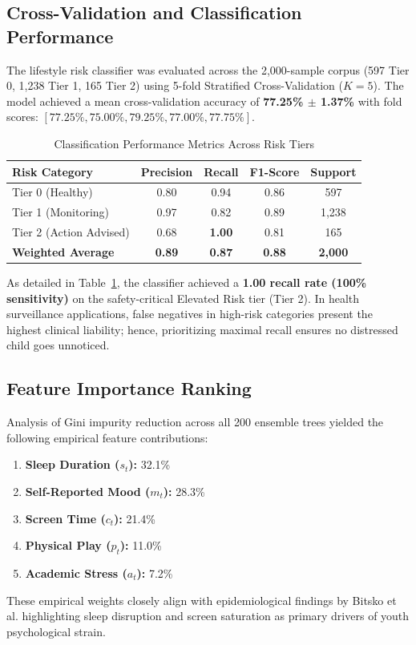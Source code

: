 \documentclass[conference]{IEEEtran}
\begin{document}
\subsection{Cross-Validation and Classification Performance}
The lifestyle risk classifier was evaluated across the 2,000-sample corpus (597 Tier 0, 1,238 Tier 1, 165 Tier 2) using 5-fold Stratified Cross-Validation ($K=5$). The model achieved a mean cross-validation accuracy of \textbf{77.25\% $\pm$ 1.37\%} with fold scores: $[77.25\%, 75.00\%, 79.25\%, 77.00\%, 77.75\%]$.

\begin{table}[htbp]
\centering
\caption{Classification Performance Metrics Across Risk Tiers}
\label{tab:metrics}
\begin{tabular}{lcccc}
\toprule
\textbf{Risk Category} & \textbf{Precision} & \textbf{Recall} & \textbf{F1-Score} & \textbf{Support} \\
\midrule
Tier 0 (Healthy) & 0.80 & 0.94 & 0.86 & 597 \\
Tier 1 (Monitoring) & 0.97 & 0.82 & 0.89 & 1,238 \\
Tier 2 (Action Advised) & 0.68 & \textbf{1.00} & 0.81 & 165 \\
\midrule
\textbf{Weighted Average} & \textbf{0.89} & \textbf{0.87} & \textbf{0.88} & \textbf{2,000} \\
\bottomrule
\end{tabular}
\end{table}

As detailed in Table~\ref{tab:metrics}, the classifier achieved a \textbf{1.00 recall rate (100\% sensitivity)} on the safety-critical Elevated Risk tier (Tier 2). In health surveillance applications, false negatives in high-risk categories present the highest clinical liability; hence, prioritizing maximal recall ensures no distressed child goes unnoticed.

\subsection{Feature Importance Ranking}
Analysis of Gini impurity reduction across all 200 ensemble trees yielded the following empirical feature contributions:
\begin{enumerate}
    \item \textbf{Sleep Duration ($s_t$):} 32.1\%
    \item \textbf{Self-Reported Mood ($m_t$):} 28.3\%
    \item \textbf{Screen Time ($c_t$):} 21.4\%
    \item \textbf{Physical Play ($p_t$):} 11.0\%
    \item \textbf{Academic Stress ($a_t$):} 7.2\%
\end{enumerate}
These empirical weights closely align with epidemiological findings by Bitsko et al. \cite{bitsko2022mental} highlighting sleep disruption and screen saturation as primary drivers of youth psychological strain.
\end{document}
